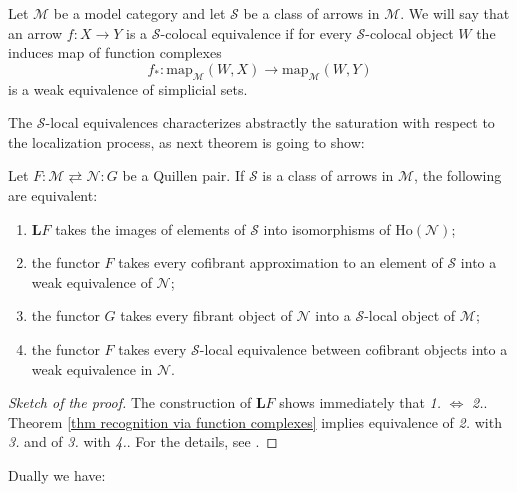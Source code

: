 \begin{defin}
Let $\mathcal M$ be a model category and let $\mathcal S$ be a class of arrows in $\mathcal M$. We will say that an arrow $f \colon X \to Y$ is a $\mathcal S$-colocal equivalence if for every $\mathcal S$-colocal object $W$ the induces map of function complexes
\[
f_* \colon \mathrm{map}_{\mathcal M}(W,X) \to \mathrm{map}_{\mathcal M}(W,Y)
\]
is a weak equivalence of simplicial sets.
\end{defin}

The $\mathcal S$-local equivalences characterizes abstractly the saturation with respect to the localization process, as next theorem is going to show:

\begin{thm} \label{thm characterizing saturation wrt left localization}
Let $F \colon \mathcal M \rightleftarrows \mathcal N \colon G$ be a Quillen pair. If $\mathcal S$ is a class of arrows in $\mathcal M$, the following are equivalent:
\begin{enumerate}
\item $\mathbf L F$ takes the images of elements of $\mathcal S$ into isomorphisms of $\mathrm{Ho}(\mathcal N)$;
\item the functor $F$ takes every cofibrant approximation to an element of $\mathcal S$ into a weak equivalence of $\mathcal N$;
\item the functor $G$ takes every fibrant object of $\mathcal N$ into a $\mathcal S$-local object of $\mathcal M$;
\item the functor $F$ takes every $\mathcal S$-local equivalence between cofibrant objects into a weak equivalence in $\mathcal N$.
\end{enumerate}
\end{thm}

\begin{proof}[Sketch of the proof]
The construction of $\mathbf L F$ shows immediately that \emph{1.} $\iff$ \emph{2.}. Theorem \ref{thm recognition via function complexes} implies equivalence of \emph{2.} with \emph{3.} and of \emph{3.} with \emph{4.}. For the details, see \cite[Theorem 3.1.6]{hirschhorn}.
\end{proof}

Dually we have:

